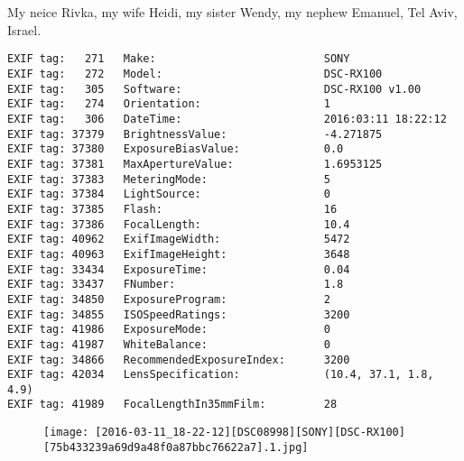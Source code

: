 \section{\protect{}}
\noindent My neice Rivka, my wife Heidi, my sister Wendy, my nephew Emanuel, Tel Aviv, Israel.
\noindent
\begin{lstlisting}
EXIF tag:   271   Make:                          SONY
EXIF tag:   272   Model:                         DSC-RX100
EXIF tag:   305   Software:                      DSC-RX100 v1.00
EXIF tag:   274   Orientation:                   1
EXIF tag:   306   DateTime:                      2016:03:11 18:22:12
EXIF tag: 37379   BrightnessValue:               -4.271875
EXIF tag: 37380   ExposureBiasValue:             0.0
EXIF tag: 37381   MaxApertureValue:              1.6953125
EXIF tag: 37383   MeteringMode:                  5
EXIF tag: 37384   LightSource:                   0
EXIF tag: 37385   Flash:                         16
EXIF tag: 37386   FocalLength:                   10.4
EXIF tag: 40962   ExifImageWidth:                5472
EXIF tag: 40963   ExifImageHeight:               3648
EXIF tag: 33434   ExposureTime:                  0.04
EXIF tag: 33437   FNumber:                       1.8
EXIF tag: 34850   ExposureProgram:               2
EXIF tag: 34855   ISOSpeedRatings:               3200
EXIF tag: 41986   ExposureMode:                  0
EXIF tag: 41987   WhiteBalance:                  0
EXIF tag: 34866   RecommendedExposureIndex:      3200
EXIF tag: 42034   LensSpecification:             (10.4, 37.1, 1.8, 4.9)
EXIF tag: 41989   FocalLengthIn35mmFilm:         28

\end{lstlisting}
\clearpage
\begin{figure}
\raggedleft
\texttt{[image: [2016-03-11\_18-22-12][DSC08998][SONY][DSC-RX100][75b433239a69d9a48f0a87bbc76622a7].1.jpg]}
\end{figure}


\clearpage
